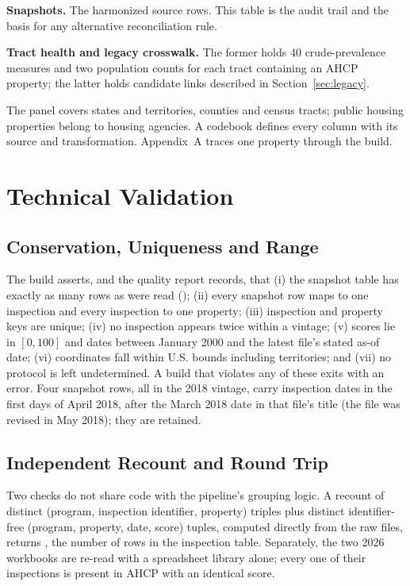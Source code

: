 \documentclass[10pt,twocolumn,letterpaper]{article}
\newcommand{\runhead}[1]{\par\vspace{0.35ex}\noindent\textbf{#1}\hspace{0.35em}}
\begin{document}
\runhead{Snapshots.} The harmonized source rows. This table is the audit trail and the basis for any alternative reconciliation rule.

\runhead{Tract health and legacy crosswalk.} The former holds 40 crude-prevalence measures and two population counts for each tract containing an AHCP property; the latter holds candidate links described in Section~\ref{sec:legacy}.

The panel covers \nStates{} states and territories, \nCounties{} counties and \nTracts{} census tracts; public housing properties belong to \nPHA{} housing agencies. A codebook defines every column with its source and transformation. Appendix~A traces one property through the build.

\section{Technical Validation}\label{sec:validation}
\subsection{Conservation, Uniqueness and Range}
The build asserts, and the quality report records, that (i) the snapshot table has exactly as many rows as were read (\SRawRows{}); (ii) every snapshot row maps to one inspection and every inspection to one property; (iii) inspection and property keys are unique; (iv) no inspection appears twice within a vintage; (v) scores lie in $[0,100]$ and dates between January 2000 and the latest file's stated as-of date; (vi) coordinates fall within U.S. bounds including territories; and (vii) no protocol is left undetermined. A build that violates any of these exits with an error. Four snapshot rows, all in the 2018 vintage, carry inspection dates in the first days of April 2018, after the March 2018 date in that file's title (the file was revised in May 2018); they are retained.

\subsection{Independent Recount and Round Trip}
Two checks do not share code with the pipeline's grouping logic. A recount of distinct (program, inspection identifier, property) triples plus distinct identifier-free (program, property, date, score) tuples, computed directly from the raw files, returns \SInspections{}, the number of rows in the inspection table. Separately, the two 2026 workbooks are re-read with a spreadsheet library alone; every one of their \curProps{} inspections is present in AHCP with an identical score.
\end{document}
